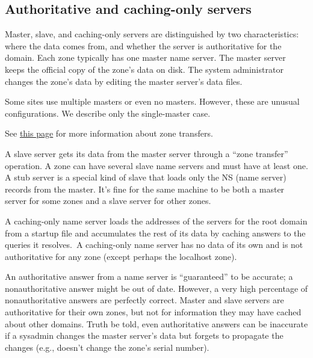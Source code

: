 \protect\hypertarget{part0024_split_012.html}{}{}

\hypertarget{part0024_split_012.htmlux5cux23_idContainer1069}{}
\hypertarget{part0024_split_012.htmlux5cux23calibre_pb_11}{%
\subsection[Authoritative and caching-only
servers]{\texorpdfstring{\protect\hypertarget{part0024_split_012.htmlux5cux23_idTextAnchor856}{}{}Authoritative
and caching-only
servers}{Authoritative and caching-only servers}}\label{part0024_split_012.htmlux5cux23calibre_pb_11}}

\protect\hypertarget{part0024_split_012.htmlux5cux23_idIndexMarker2026}{}{}\protect\hypertarget{part0024_split_012.htmlux5cux23_idIndexMarker2027}{}{}Master,
slave, and caching-only servers are distinguished by two
characteristics: where the data comes from, and whether the server is
authoritative for the domain. Each zone typically has one master name
server. The master server keeps the official copy of the zone's data on
disk. The system administrator changes the zone's data by editing the
master server's data files.

Some sites use multiple masters or even no masters. However, these are
unusual configurations. We describe only the single-master case.

\leavevmode\hypertarget{part0024_split_012.htmlux5cux23_idContainer914}{}%
See
\protect\hyperlink{part0024_split_051.htmlux5cux23_idTextAnchor927}{this
page} for more information about zone transfers.

A slave server gets its data from the master server through a ``zone
transfer'' operation. A zone can have several slave name servers and
{must} have at least one. A stub server is a special kind of slave that
loads only the NS (name server) records from the master. It's fine for
the same machine to be both a master server for some zones and a slave
server for other zones.

A
\protect\hypertarget{part0024_split_012.htmlux5cux23_idIndexMarker2028}{}{}caching-only
name server loads the addresses of the servers for the root domain from
a startup file and accumulates the rest of its data by caching answers
to the queries it resolves.~A caching-only name server has no data of
its own and is not authoritative for any zone (except perhaps the
localhost zone).

An authoritative answer from a name server is ``guaranteed'' to be
accurate; a nonauthoritative answer might be out of date. However, a
very high percentage of nonauthoritative answers are perfectly correct.
Master and slave servers are authoritative for their own zones, but not
for information they may have cached about other domains. Truth be told,
even authoritative answers can be inaccurate if a sysadmin changes the
master server's data but forgets to propagate the changes (e.g., doesn't
change the zone's serial number).

